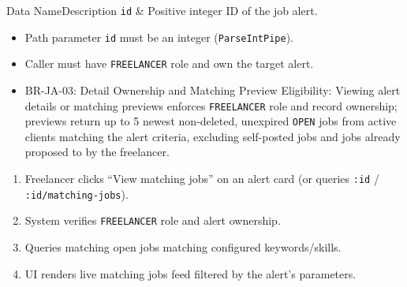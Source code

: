 
\begin{specdatatable}{Data Name}{Description}
\texttt{id} & Positive integer ID of the job alert.\\ \hline
\end{specdatatable}

\begin{itemize}[leftmargin=1.6em,topsep=3pt,itemsep=2pt,parsep=0pt,label=$\bullet$]
    \item Path parameter \texttt{id} must be an integer (\texttt{ParseIntPipe}).
    \item Caller must have \texttt{FREELANCER} role and own the target alert.
\end{itemize}

\begin{itemize}[leftmargin=1.6em,topsep=3pt,itemsep=2pt,parsep=0pt,label=$\bullet$]\brrulelist
    \item BR-JA-03: Detail Ownership and Matching Preview Eligibility: Viewing alert details or matching previews enforces \texttt{FREELANCER} role and record ownership; previews return up to 5 newest non-deleted, unexpired \texttt{OPEN} jobs from active clients matching the alert criteria, excluding self-posted jobs and jobs already proposed to by the freelancer.
\end{itemize}

\begin{enumerate}[leftmargin=1.8em,topsep=3pt,itemsep=2pt,parsep=0pt]
    \item Freelancer clicks ``View matching jobs'' on an alert card (or queries \texttt{:id} / \texttt{:id/matching-jobs}).
    \item System verifies \texttt{FREELANCER} role and alert ownership.
    \item Queries matching open jobs matching configured keywords/skills.
    \item UI renders live matching jobs feed filtered by the alert's parameters.
\end{enumerate}


